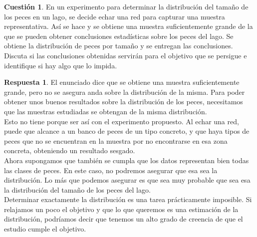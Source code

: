 \documentclass[10pt,a4paper]{article}
\theoremstyle{definition}
\newtheorem{cuestion}{Cuestión}
\newtheorem*{respuesta}{Respuesta}
\begin{document}
\begin{cuestion}
En un experimento para determinar la distribución del tamaño de los peces en un lago, se decide echar una red para capturar una muestra representativa. Así se hace y se obtiene una muestra suficientemente grande de la que se pueden obtener conclusiones estadísticas sobre los peces del lago. Se obtiene la distribución de peces por tamaño y se entregan las conclusiones. Discuta si las conclusiones obtenidas servirán para el objetivo que se persigue e identifique si hay algo que lo impida.\\

\end{cuestion}
\begin{respuesta}
El enunciado dice que se obtiene una muestra suficientemente grande, pero no se asegura anda sobre la distribución de la misma. Para poder obtener unos buenos resultados sobre la distribución de los peces, necesitamos que las muestras estudiadas se obtengan de la misma distribución.\\

Esto no tiene porque ser así con el experimento propuesto. Al echar una red, puede que alcance a un banco de peces de un tipo concreto, y que haya tipos de peces que no se encuentran en la muestra por no encontrarse en esa zona concreta, obteniendo un resultado sesgado.\\

Ahora supongamos que también se cumpla que los datos representan bien todas las clases de peces. En este caso, no podremos asegurar que esa sea la distribución. Lo más que podemos asegurar es que sea muy probable que sea esa la distribución del tamaño de los peces del lago.\\
 
Determinar exactamente la distribución es una tarea prácticamente imposible. Si relajamos un poco el objetivo y que lo que queremos es una estimación de la distribución, podríamos decir que tenemos un alto grado de creencia de que el estudio cumple el objetivo.
\end{respuesta}
\end{document}
